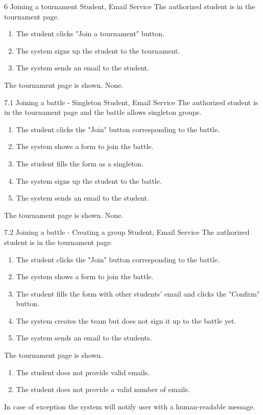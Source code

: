 \usecase
{6}
{Joining a tournament}
{Student, Email Service}
{The authorized student is in the tournament page.}
{
    \begin{enumerate}
        \item The student clicks "Join a tournament" button.
        \item The system signs up the student to the tournament.
        \item The system sends an email to the student.
    \end{enumerate}
}
{The tournament page is shown.}
{
    None.
}
{}

\clearpage

\usecase
{7.1}
{Joining a battle - Singleton}
{Student, Email Service}
{The authorized student is in the tournament page and the battle allows singleton groups.}
{
    \begin{enumerate}
        \item The student clicks the "Join" button corresponding to the battle.
        \item The system shows a form to join the battle.
        \item The student fills the form as a singleton.
        \item The system signs up the student to the battle.
        \item The system sends an email to the student.
    \end{enumerate}
}
{The tournament page is shown.}
{
    None.
}
{}

\clearpage

\usecase
{7.2}
{Joining a battle - Creating a group}
{Student, Email Service}
{The authorized student is in the tournament page.}
{
    \begin{enumerate}
        \item The student clicks the "Join" button corresponding to the battle.
        \item The system shows a form to join the battle.
        \item The student fills the form with other students' email and clicks the "Confirm" button.
        \item The system creates the team but does not sign it up to the battle yet.
        \item The system sends an email to the students.
    \end{enumerate}
}
{The tournament page is shown.}
{
    \begin{enumerate}
        \item The student does not provide valid emails.
        \item The student does not provide a valid number of emails.
    \end{enumerate}

}
{
    In case of exception the system will notify user with a human-readable message.
}

